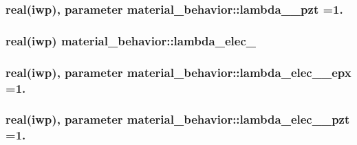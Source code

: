 \subsubsection[{lambda\+\_\+01\+\_\+pzt}]{\setlength{\rightskip}{0pt plus 5cm}real(iwp), parameter material\+\_\+behavior\+::lambda\+\_\+\_\+pzt =1.}\label{classmaterial__behavior_a211dd81ae27709e6027a897a00bc94f8}
\hypertarget{classmaterial__behavior_a2ac87e6361866b09f1c027d637477ae7}{}
\subsubsection[{lambda\+\_\+elec\+\_\+01}]{\setlength{\rightskip}{0pt plus 5cm}real(iwp) material\+\_\+behavior\+::lambda\+\_\+elec\+\_}\label{classmaterial__behavior_a2ac87e6361866b09f1c027d637477ae7}
\hypertarget{classmaterial__behavior_a4d52ced459ab4f48c6c53abdf2e315d3}{}
\subsubsection[{lambda\+\_\+elec\+\_\+01\+\_\+epx}]{\setlength{\rightskip}{0pt plus 5cm}real(iwp), parameter material\+\_\+behavior\+::lambda\+\_\+elec\+\_\+\_\+epx =1.}\label{classmaterial__behavior_a4d52ced459ab4f48c6c53abdf2e315d3}
\hypertarget{classmaterial__behavior_a132fe5a8a83e1e18fa19e3c006520c52}{}
\subsubsection[{lambda\+\_\+elec\+\_\+01\+\_\+pzt}]{\setlength{\rightskip}{0pt plus 5cm}real(iwp), parameter material\+\_\+behavior\+::lambda\+\_\+elec\+\_\+\_\+pzt =1.}\label{classmaterial__behavior_a132fe5a8a83e1e18fa19e3c006520c52}
\hypertarget{classmaterial__behavior_a485aff3d8ce94cb516029491df025096}{}
